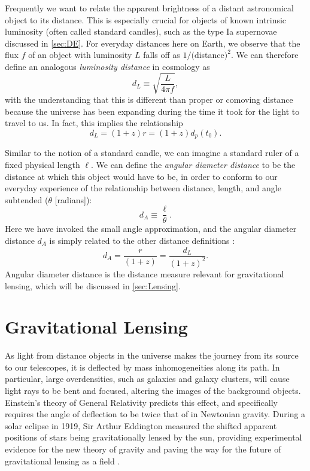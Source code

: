 Frequently we want to relate the apparent brightness of a distant astronomical object to its distance. This is especially crucial for objects of known intrinsic luminosity (often called standard candles), such as the type Ia supernovae discussed in \autoref{sec:DE}. For everyday distances here on Earth, we observe that the flux $f$ of an object with luminosity $L$ falls off as $1/($distance$)^2$. We can therefore define an analogous {\it luminosity distance} in cosmology as
\begin{equation}
\label{eqn:dL}
d_L \equiv \sqrt{\frac{L}{4\pi f}},
\end{equation}
with the understanding that this is different than proper or comoving distance because the universe has been expanding during the time it took for the light to travel to us. In fact, this implies the relationship
\begin{equation}
d_L = (1+z)r = (1+z)d_p(t_0).
\end{equation}

Similar to the notion of a standard candle, we can imagine a standard ruler of a fixed physical length $\ell$. We can define the {\it angular diameter distance} to be the distance at which this object would have to be, in order to conform to our everyday experience of the relationship between distance, length, and angle subtended ($\theta$ [radians]):
\begin{equation}
d_A \equiv \frac{\ell}{\theta}.
\end{equation}
Here we have invoked the small angle approximation, and the angular diameter distance $d_A$ is simply related to the other distance definitions \citep{RydenText}:
\begin{equation}
d_A = \frac{r}{(1+z)}= \frac{d_L}{(1+z)^2}.
\end{equation}
Angular diameter distance is the distance measure relevant for gravitational lensing, which will be discussed in \autoref{sec:Lensing}.

\section{Gravitational Lensing}
\label{sec:Lensing}

As light from distance objects in the universe makes the journey from its source to our telescopes, it is deflected by mass inhomogeneities along its path. In particular, large overdensities, such as galaxies and galaxy clusters, will cause light rays to be bent and focused, altering the images of the background objects. Einstein's theory of General Relativity predicts this effect, and specifically requires the angle of deflection to be twice that of in Newtonian gravity. During a solar eclipse in 1919, Sir Arthur Eddington measured the shifted apparent positions of stars being gravitationally lensed by the sun, providing experimental evidence for the new theory of gravity and paving the way for the future of gravitational lensing as a field \citep{BS01}.

